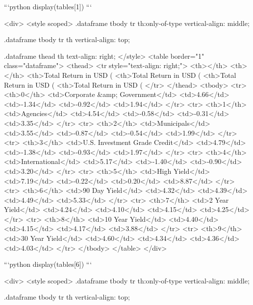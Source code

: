 {{```python
display(tables[1])
```


<div>
<style scoped>
    .dataframe tbody tr th:only-of-type {
        vertical-align: middle;
    }

    .dataframe tbody tr th {
        vertical-align: top;
    }

    .dataframe thead th {
        text-align: right;
    }
</style>
<table border="1" class="dataframe">
  <thead>
    <tr style="text-align: right;">
      <th></th>
      <th></th>
      <th>Total Return in USD (%
      <th>Total Return in USD (%
      <th>Total Return in USD (%
      <th>Total Return in USD (%
    </tr>
  </thead>
  <tbody>
    <tr>
      <th>0</th>
      <td>Corporate &amp; Government</td>
      <td>4.66</td>
      <td>-1.34</td>
      <td>-0.92</td>
      <td>1.94</td>
    </tr>
    <tr>
      <th>1</th>
      <td>Agencies</td>
      <td>4.54</td>
      <td>-0.58</td>
      <td>-0.31</td>
      <td>3.35</td>
    </tr>
    <tr>
      <th>2</th>
      <td>Municipals</td>
      <td>3.55</td>
      <td>-0.87</td>
      <td>-0.54</td>
      <td>1.99</td>
    </tr>
    <tr>
      <th>3</th>
      <td>U.S. Investment Grade Credit</td>
      <td>4.79</td>
      <td>-1.38</td>
      <td>-0.93</td>
      <td>1.97</td>
    </tr>
    <tr>
      <th>4</th>
      <td>International</td>
      <td>5.17</td>
      <td>-1.40</td>
      <td>-0.90</td>
      <td>3.20</td>
    </tr>
    <tr>
      <th>5</th>
      <td>High Yield</td>
      <td>7.19</td>
      <td>-0.22</td>
      <td>0.20</td>
      <td>8.87</td>
    </tr>
    <tr>
      <th>6</th>
      <td>90 Day Yield</td>
      <td>4.32</td>
      <td>4.39</td>
      <td>4.49</td>
      <td>5.33</td>
    </tr>
    <tr>
      <th>7</th>
      <td>2 Year Yield</td>
      <td>4.24</td>
      <td>4.10</td>
      <td>4.15</td>
      <td>4.25</td>
    </tr>
    <tr>
      <th>8</th>
      <td>10 Year Yield</td>
      <td>4.40</td>
      <td>4.15</td>
      <td>4.17</td>
      <td>3.88</td>
    </tr>
    <tr>
      <th>9</th>
      <td>30 Year Yield</td>
      <td>4.60</td>
      <td>4.34</td>
      <td>4.36</td>
      <td>4.03</td>
    </tr>
  </tbody>
</table>
</div>



```python
display(tables[6])
```


<div>
<style scoped>
    .dataframe tbody tr th:only-of-type {
        vertical-align: middle;
    }

    .dataframe tbody tr th {
        vertical-align: top;
    }

}}
